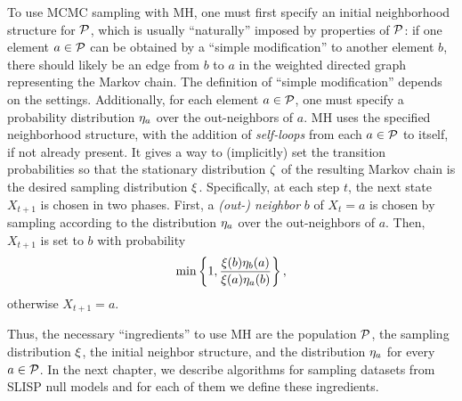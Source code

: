 To use MCMC sampling with MH, one must first specify an initial neighborhood
structure for $\mathcal{P}$, which is usually ``naturally'' imposed by
properties of $\mathcal{P}$: if one element $a \in \mathcal{P}$ can be obtained
by a ``simple modification'' to another element $b$, there should likely be an
edge from $b$ to $a$ in the weighted directed graph representing the Markov
chain. The definition of ``simple modification'' depends on the settings.
Additionally, for each element $a \in \mathcal{P}$, one must specify a
probability distribution $\eta_a$ over the out-neighbors of $a$.
MH uses the specified neighborhood structure, with the addition
of \emph{self-loops} from each $a \in \mathcal{P}$ to itself, if not already
present. It gives a way to (implicitly) set the transition probabilities so that
the stationary distribution $\zeta$ of the resulting Markov chain is the
desired sampling distribution $\xi$. Specifically, at each step $t$, the
next state $X_{t+1}$ is chosen in two phases. First, a \emph{(out-) neighbor}
$b$ of $X_t=a$ is chosen by sampling according to the distribution
$\eta_a$ over the out-neighbors of $a$. Then, $X_{t+1}$ is set to $b$ with
probability
\begin{equation}\label{eq:metropolis}
  \min \left\{1, \frac{\xi(b) \eta_b(a)}{\xi(a)
  \eta_a(b)} \right\},
\end{equation}
otherwise $X_{t+1}=a$.

Thus, the necessary ``ingredients'' to use MH are the population $\mathcal{P}$,
the sampling distribution $\xi$, the initial neighbor structure, and the
distribution $\eta_a$ for every $a \in \mathcal{P}$. In the next chapter,
we describe algorithms for sampling datasets from SLISP null models and for each
of them we define these ingredients.

